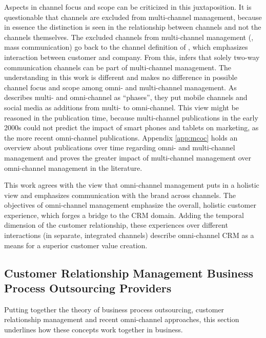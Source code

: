 	 Aspects in channel focus and scope can be criticized in this juxtaposition. It is questionable that channels are excluded from multi-channel management, because in essence the distinction is seen in the relationship between channels and not the channels themselves. The excluded channels from multi-channel management (\viz, mass communication) go back to the channel definition of \citeauthor{Neslin2006}, which emphasizes interaction between customer and company. From this, \citeauthor{vorhoef2015retail} infers that solely two-way communication channels can be part of multi-channel management. The understanding in this work is different and makes no difference in possible channel focus and scope among omni- and multi-channel management. As \citeauthor{vorhoef2015retail} describes multi- and omni-channel as \enquote{phases}, they put mobile channels and social media as additions from multi- to omni-channel. This view might be reasoned in the publication time, because multi-channel publications in the early 2000s could not predict the impact of smart phones and tablets on marketing, as the more recent omni-channel publications. Appendix \ref{app:mcoc} holds an overview about publications over time regarding omni- and multi-channel management and proves the greater impact of multi-channel management over omni-channel management in the literature. 
	 
	 This work agrees with the view that omni-channel management puts in a holistic view and emphasizes communication with the brand across channels. The objectives of omni-channel management emphasize the overall, holistic customer experience, which forges a bridge to the \acrshort{CRM} domain. Adding the temporal dimension of the customer relationship, these experiences over different interactions (in separate, integrated channels) describe omni-channel \acrshort{CRM} as a means for a superior customer value creation. 
		\subsection{Customer Relationship Management Business Process Outsourcing Providers}
		Putting together the theory of business process outsourcing, customer relationship management and recent omni-channel approaches, this section underlines how these concepts work together in business. 
		

